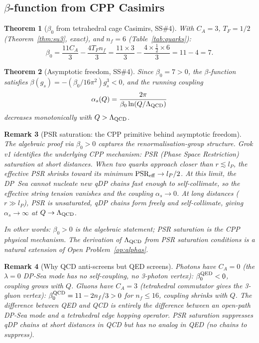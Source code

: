 \documentclass[11pt,a4paper]{article}
\newtheorem{theorem}{Theorem}[section]
\newtheorem{remark}[theorem]{Remark}
\newcommand{\lP}{l_P}
\newcommand{\as}{\alpha_s}
\begin{document}
\subsection{$\beta$-function from CPP Casimirs}

\begin{theorem}[$\beta_0$ from tetrahedral cage Casimirs, SS\#4]
\label{thm:beta0}
With $C_A = 3$, $T_F = 1/2$ (Theorem~\ref{thm:su3}, exact), and
$n_f = 6$ (Table~\ref{tab:quarks}):
\begin{equation}
\beta_0 = \frac{11C_A}{3} - \frac{4T_F n_f}{3}
= \frac{11\times3}{3} - \frac{4\times\tfrac{1}{2}\times6}{3}
= 11 - 4 = 7.
\label{eq:beta0}
\end{equation}
\end{theorem}

\begin{theorem}[Asymptotic freedom, SS\#4]
\label{thm:af}
Since $\beta_0 = 7 > 0$, the $\beta$-function satisfies
$\beta(g_s) = -(\beta_0/16\pi^2)g_s^3 < 0$, and the running
coupling
\begin{equation}
\as(Q) = \frac{2\pi}{\beta_0\ln(Q/\Lambda_{\rm QCD})}
\label{eq:running}
\end{equation}
decreases monotonically with $Q > \Lambda_{\rm QCD}$.
\end{theorem}

\begin{remark}[PSR saturation: the CPP primitive behind asymptotic freedom]
\label{rem:psr}
The algebraic proof via $\beta_0 > 0$ captures the
renormalisation-group structure.  Grok v1 identifies the underlying
CPP mechanism: \emph{PSR (Phase Space Restriction) saturation at
short distances}.  When two quarks approach closer than
$r \lesssim \lP$, the effective PSR shrinks toward its minimum
$\text{PSR}_{\rm eff} \to \lP/2$.  At this limit, the DP~Sea cannot
nucleate new qDP chains fast enough to self-collimate, so the
effective string tension vanishes and the coupling $\as \to 0$.
At long distances ($r \gg \lP$), PSR is unsaturated, qDP chains
form freely and self-collimate, giving $\as \to \infty$ at
$Q \to \Lambda_{\rm QCD}$.

In other words: $\beta_0 > 0$ is the algebraic statement;
PSR saturation is the CPP physical mechanism.  The derivation
of $\Lambda_{\rm QCD}$ from PSR saturation conditions is a
natural extension of Open Problem~\ref{op:alphas}.
\end{remark}

\begin{remark}[Why QCD anti-screens but QED screens]
Photons have $C_A = 0$ (the $\lambda=0$ DP-Sea mode has no
self-coupling, no 3-photon vertex): $\beta_0^{\rm QED} < 0$,
coupling grows with $Q$.  Gluons have $C_A = 3$ (tetrahedral
commutator gives the 3-gluon vertex): $\beta_0^{\rm QCD} = 11 -
2n_f/3 > 0$ for $n_f \leq 16$, coupling shrinks with $Q$.  The
difference between QED and QCD is entirely the difference between
an open-path DP-Sea mode and a tetrahedral edge hopping operator.
PSR saturation suppresses qDP chains at short distances in QCD
but has no analog in QED (no chains to suppress).
\end{remark}
\end{document}
